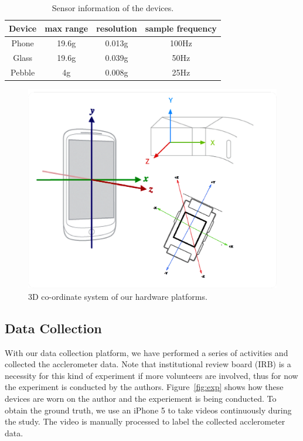 \begin{table}
  \centering
  \begin{tabular}{c|c|c|c}
    \hline
    Device & max range & resolution & sample frequency \\
    \hline
    Phone  & 19.6g     & 0.013g     & 100Hz  \\
    Glass  & 19.6g     & 0.039g     & 50Hz   \\
    Pebble & 4g        & 0.008g     & 25Hz   \\
    \hline
  \end{tabular}
  \caption{Sensor information of the devices.}
  \label{tab:sensorinfo}
\end{table}

\begin{figure}
  \centering
  \includegraphics[width=0.9\columnwidth]{figures/coordinates.png}
  \caption{3D co-ordinate system of our hardware platforms.}
  \label{fig:coordinate}
\end{figure}

\vfill
\subsection{Data Collection}
\label{sec:data-collection-2}

With our data collection platform, we have performed a series of activities and collected the acclerometer data. Note that institutional review board (IRB) is a necessity for this kind of experiment if more volunteers are involved, thus for now the experiment is conducted by the authors. Figure~\ref{fig:exp} shows how these devices are worn on the author and the experiement is being conducted. To obtain the ground truth, we use an iPhone 5 to take videos continuously during the study. The video is manually processed to label the collected acclerometer data.

